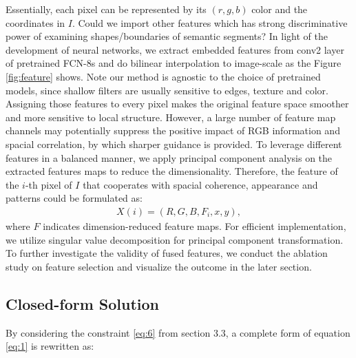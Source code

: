 \documentclass[sigconf]{acmart}
\begin{document}
Essentially, each pixel can be represented by its $(r, g, b)$ color and the coordinates in $I$. Could we import other features which has strong discriminative power of examining shapes/boundaries of semantic segments? In light of the development of neural networks, we extract embedded features from conv2 layer of pretrained FCN-8s and do bilinear interpolation to image-scale as the Figure \ref{fig:feature} shows. Note our method is agnostic to the choice of pretrained models, since shallow filters are usually sensitive to edges, texture and color. Assigning those features to every pixel makes the original feature space smoother and more sensitive to local structure. However, a large number of feature map channels may potentially suppress the positive impact of RGB information and spacial correlation, by which sharper guidance is provided. To leverage different features in a balanced manner, we apply principal component analysis on the extracted features maps to reduce the dimensionality. Therefore, the feature of the $i$-th pixel of $I$ that cooperates with spacial coherence, appearance and patterns could be formulated as:
\begin{equation}
\begin{split}
X(i) = (R, G, B, F_i, x, y),
\end{split}
\end{equation}
where $F$ indicates dimension-reduced feature maps. For efficient implementation, we utilize singular value decomposition for principal component transformation. To further investigate the validity of fused features, we conduct the ablation study on feature selection and visualize the outcome in the later section. 


\subsection{Closed-form Solution}

By considering the constraint \eqref{eq:6} from section 3.3, a complete form of equation \eqref{eq:1} is rewritten as:
\end{document}
